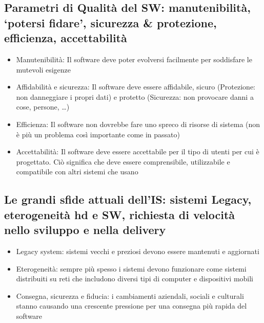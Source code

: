 \subsection{Parametri di Qualità del SW: manutenibilità, ‘potersi fidare’, sicurezza \& protezione, efficienza, accettabilità}
\begin{itemize}
    \item Manutenibilità: Il software deve poter evolversi facilmente per soddisfare le mutevoli esigenze
    \item Affidabilità e sicurezza: Il software deve essere affidabile, sicuro (Protezione: non danneggiare i propri dati) e protetto (Sicurezza: non provocare danni a cose, persone, \dots)
    \item Efficienza: Il software non dovrebbe fare uno spreco di risorse di sistema (non è più un problema così importante come in passato)
    \item Accettabilità: Il software deve essere accettabile per il tipo di utenti per cui è progettato. Ciò significa che deve essere comprensibile, utilizzabile e compatibile con altri sistemi che usano
\end{itemize}

\subsection{Le grandi sfide attuali dell’IS: sistemi Legacy, eterogeneità hd e SW, richiesta di velocità nello sviluppo e nella delivery}
\begin{itemize}
    \item Legacy system: sistemi vecchi e preziosi devono essere mantenuti e aggiornati
    \item Eterogeneità: sempre più spesso i sistemi devono funzionare come sistemi distribuiti su reti che includono diversi tipi di computer e dispositivi mobili
    \item Consegna, sicurezza e fiducia: i cambiamenti aziendali, sociali e culturali stanno causando una crescente pressione per una consegna più rapida del software
\end{itemize}

